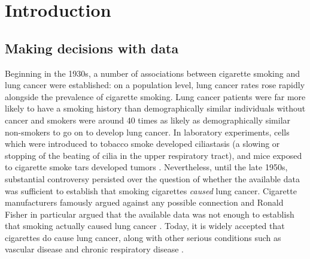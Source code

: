 

\chapter{Introduction}\label{ch:introduction}

\section{Making decisions with data}

Beginning in the 1930s, a number of associations between cigarette smoking and lung cancer were established: on a population level, lung cancer rates rose rapidly alongside the prevalence of cigarette smoking. Lung cancer patients were far more likely to have a smoking history than demographically similar individuals without cancer and smokers were around 40 times as likely as demographically similar non-smokers to go on to develop lung cancer. In laboratory experiments, cells which were introduced to tobacco smoke developed ciliastasis (a slowing or stopping of the beating of cilia in the upper respiratory tract), and mice exposed to cigarette smoke tars developed tumors \citep{proctor_history_2012}. Nevertheless, until the late 1950s, substantial controversy persisted over the question of whether the available data was sufficient to establish that smoking cigarettes \emph{caused} lung cancer. Cigarette manufacturers famously argued against any possible connection \citep{oreskes_merchants_2011} and Ronald Fisher in particular argued that the available data was not enough to establish that smoking actually caused lung cancer \citep{fisher_cancer_1958}. Today, it is widely accepted that cigarettes do cause lung cancer, along with other serious conditions such as vascular disease and chronic respiratory disease \citep{world_health_organisation_tobacco_nodate,wiblin_why_2016}.

